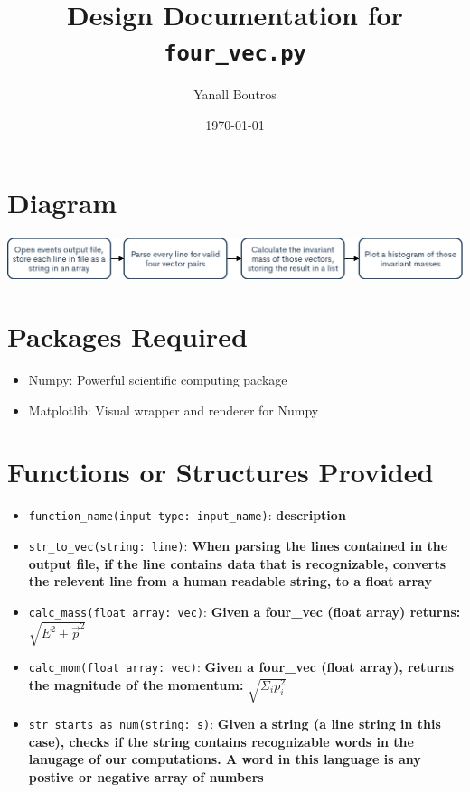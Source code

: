 \documentclass{article}
\begin{document}
\title{Design Documentation for \texttt{four\_vec.py}}
\author{Yanall Boutros}
\date{\today}
\maketitle
\section*{Diagram}
\includegraphics[scale=0.3]{diag.png}
\section*{Packages Required}
\begin{itemize}
  \item Numpy:      Powerful scientific computing package
  \item Matplotlib: Visual wrapper and renderer for Numpy
\end{itemize}
\section*{Functions or Structures Provided}
\begin{itemize}
  \item \texttt{function\_name(input type: input\_name)}:
    \textbf{description}
  \item \texttt{str\_to\_vec(string: line)}:
    \textbf{When parsing the lines contained in the output file,
    if the line contains data that is recognizable, converts the 
    relevent line from a human readable string, to a float array}
  \item \texttt{calc\_mass(float array: vec)}:
    \textbf{Given a four\_vec (float array) returns: }
    $\sqrt{E^2 + \vec{p}^2}$
  \item \texttt{calc\_mom(float array: vec)}:
    \textbf{Given a four\_vec (float array), returns the magnitude 
    of the momentum: } $\sqrt{\Sigma_ip_i^2}$
  \item \texttt{str\_starts\_as\_num(string: s)}:
    \textbf{Given a string (a line string in this case), checks if
    the string contains recognizable words in the lanugage of our
    computations. A word in this language is any postive or negative 
    array of numbers}
\end{itemize}
\end{document}
